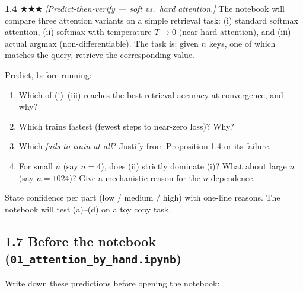 \documentclass[
]{article}
\providecommand{\tightlist}{%
  \setlength{\itemsep}{0pt}\setlength{\parskip}{0pt}}
\begin{document}
\textbf{1.4 ★★★} \emph{{[}Predict-then-verify --- soft vs.~hard
attention.{]}} The notebook will compare three attention variants on a
simple retrieval task: (i) standard softmax attention, (ii) softmax with
temperature \(T \to 0\) (near-hard attention), and (iii) actual argmax
(non-differentiable). The task is: given \(n\) keys, one of which
matches the query, retrieve the corresponding value.

Predict, before running:

\begin{enumerate}
\def\labelenumi{(\alph{enumi})}
\tightlist
\item
  Which of (i)--(iii) reaches the best retrieval accuracy at
  convergence, and why?
\item
  Which trains fastest (fewest steps to near-zero loss)? Why?
\item
  Which \emph{fails to train at all}? Justify from Proposition 1.4 or
  its failure.
\item
  For small \(n\) (say \(n = 4\)), does (ii) strictly dominate (i)? What
  about large \(n\) (say \(n = 1024\))? Give a mechanistic reason for
  the \(n\)-dependence.
\end{enumerate}

State confidence per part (low / medium / high) with one-line reasons.
The notebook will test (a)--(d) on a toy copy task.

\hypertarget{before-the-notebook-01_attention_by_hand.ipynb}{%
\subsection{\texorpdfstring{1.7 Before the notebook
(\texttt{01\_attention\_by\_hand.ipynb})}{1.7 Before the notebook (01\_attention\_by\_hand.ipynb)}}\label{before-the-notebook-01_attention_by_hand.ipynb}}

Write down these predictions before opening the notebook:
\end{document}
